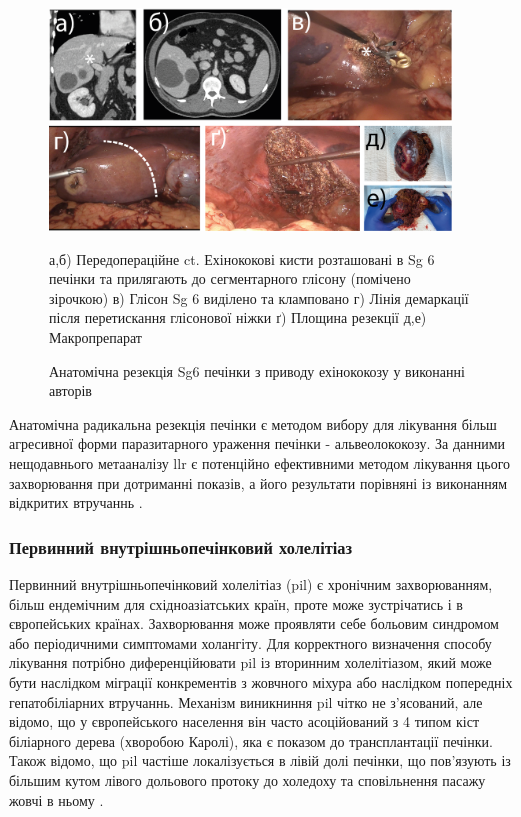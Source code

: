 \begin{figure}[h]
\caption{Анатомічна резекція Sg6 печінки з приводу ехінококозу у виконанні авторів}
\includegraphics[width=0.95\textwidth]{Illustrations/Chapter_01/ECC-Sg6.png}
\label{fig:ECC-Sg6}

\medskip
\small
а,б) Передопераційне \acrshort{ct}. Ехінококові кисти розташовані в Sg 6 печінки та прилягають до сегментарного глісону (помічено зірочкою) в) Глісон Sg 6 виділено та кламповано г) Лінія демаркації після перетискання глісонової ніжки ґ) Площина резекції д,е) Макропрепарат  

\end{figure}



Анатомічна радикальна резекція печінки є методом вибору для лікування більш агресивної форми паразитарного ураження печінки - альвеолококозу. За данними нещодавнього метааналізу \acrshort{llr} є потенційно ефективними методом лікування цього захворювання при дотриманні показів, а його результати порівняні із виконанням відкритих втручаннь \cite{Salm2019}. 

\subsubsection{Первинний внутрішньопечінковий холелітіаз}

Первинний внутрішньопечінковий холелітіаз (\acrshort{pil}) є хронічним захворюванням, більш ендемічним для східноазіатських країн, проте може зустрічатись і в європейських країнах. Захворювання може проявляти себе больовим синдромом або періодичними симптомами холангіту. Для корректного визначення способу лікування потрібно диференційювати \acrshort{pil} із вторинним холелітіазом, який може бути наслідком міграції конкрементів з жовчного міхура або наслідком попередніх гепатобіліарних втручаннь. Механізм виникниння \acrshort{pil} чітко не з'ясований, але відомо, що у європейського населення він часто асоційований з 4 типом кіст біліарного дерева (хворобою Каролі), яка є показом до трансплантації печінки. Також відомо, що \acrshort{pil} частіше локалізується в лівій долі печінки, що пов'язують із більшим кутом лівого дольового протоку до холедоху та сповільнення пасажу жовчі в ньому \cite{Giuliante2015}.

